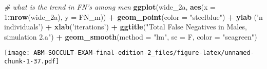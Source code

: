 \documentclass[]{article}
\newenvironment{Shaded}{\begin{snugshade}}{\end{snugshade}}
\newcommand{\KeywordTok}[1]{\textcolor[rgb]{0.13,0.29,0.53}{\textbf{#1}}}
\newcommand{\DataTypeTok}[1]{\textcolor[rgb]{0.13,0.29,0.53}{#1}}
\newcommand{\DecValTok}[1]{\textcolor[rgb]{0.00,0.00,0.81}{#1}}
\newcommand{\StringTok}[1]{\textcolor[rgb]{0.31,0.60,0.02}{#1}}
\newcommand{\CommentTok}[1]{\textcolor[rgb]{0.56,0.35,0.01}{\textit{#1}}}
\newcommand{\OperatorTok}[1]{\textcolor[rgb]{0.81,0.36,0.00}{\textbf{#1}}}
\newcommand{\NormalTok}[1]{#1}
\begin{document}
\begin{Shaded}
\begin{Highlighting}[]
\CommentTok{# what is the trend in FN's among men}
\KeywordTok{ggplot}\NormalTok{(wide_2a, }\KeywordTok{aes}\NormalTok{(}\DataTypeTok{x =} \DecValTok{1}\OperatorTok{:}\KeywordTok{nrow}\NormalTok{(wide_2a), }\DataTypeTok{y =}\NormalTok{ FN_m)) }\OperatorTok{+}\StringTok{ }
\StringTok{  }\KeywordTok{geom_point}\NormalTok{(}\DataTypeTok{color =} \StringTok{"steelblue"}\NormalTok{) }\OperatorTok{+}
\StringTok{  }\KeywordTok{ylab}\NormalTok{ (}\StringTok{'n individuals'}\NormalTok{) }\OperatorTok{+}\StringTok{ }\KeywordTok{xlab}\NormalTok{(}\StringTok{'iterations'}\NormalTok{) }\OperatorTok{+}
\StringTok{  }\KeywordTok{ggtitle}\NormalTok{(}\StringTok{"Total False Negatives in Males, simulation 2.a"}\NormalTok{) }\OperatorTok{+}
\StringTok{  }\KeywordTok{geom_smooth}\NormalTok{(}\DataTypeTok{method =} \StringTok{"lm"}\NormalTok{, }\DataTypeTok{se =}\NormalTok{ F, }\DataTypeTok{color =} \StringTok{"seagreen"}\NormalTok{)}
\end{Highlighting}
\end{Shaded}

\texttt{[image: ABM---SOCCULT-EXAM---final-edition-2\_files/figure-latex/unnamed-chunk-1-37.pdf]}
\end{document}
